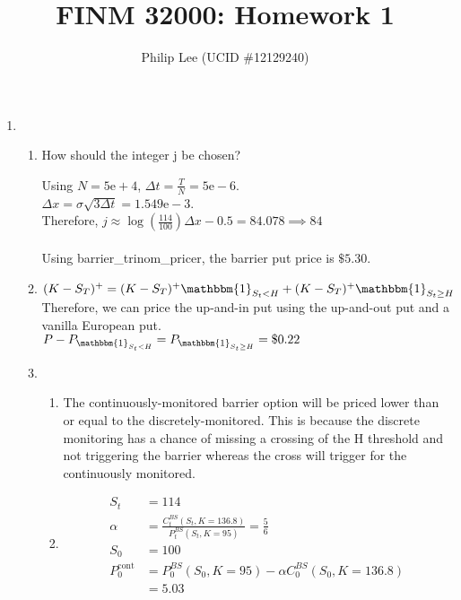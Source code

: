\documentclass{article}
\title{FINM 32000: Homework 1}
\author{Philip Lee (UCID \#12129240)}
\begin{document}
\maketitle

\begin{enumerate}
\item

\begin{enumerate}
	\item How should the integer j be chosen?
	
	Using $N=5\mathrm{e}+4$, $\Delta t =\frac{T}{N}= 5\mathrm{e}-6$. \\
	$\Delta x = \sigma \sqrt{3 \Delta t} = 1.549\mathrm{e}-3$.\\
	Therefore, $j \approx \log(\frac{114}{100}) \Delta x -0.5=84.078 \implies 84$ \\
	\\
	Using barrier\_trinom\_pricer, the barrier put price is $\$5.30$.
	
	\item $(K-S_T)^+ = (K-S_T)^+ \mathbbm{1}_{S_t<H} + (K-S_T)^+ \mathbbm{1}_{S_t \geq H}$ \\
	Therefore, we can price the up-and-in put using the up-and-out put and a vanilla European put. \\
	$P-P_{\mathbbm{1}_{S_t<H}} = P_{\mathbbm{1}_{S_t \geq H}}=\$0.22$
	
	\item
	\begin{enumerate}
	\item The continuously-monitored barrier option will be priced lower than or equal to the discretely-monitored. This is because the discrete monitoring has a chance of missing a crossing of the H threshold and not triggering the barrier whereas the cross will trigger for the continuously monitored.
	\item 
	$$\begin{aligned}
	S_t &= 114 \\
	\alpha &= \frac{C_t^{BS}(S_t,K=136.8)}{P_t^{BS}(S_t,K=95)} = \frac{5}{6} \\
	S_0 &= 100 \\
	P_0^{\text{cont}} &= P_0^{BS}(S_0,K=95) - \alpha C_0^{BS}(S_0,K=136.8) \\
		&= 5.03
	\end{aligned}$$
	\end{enumerate}
	

\end{enumerate}
\end{enumerate}
\end{document}
